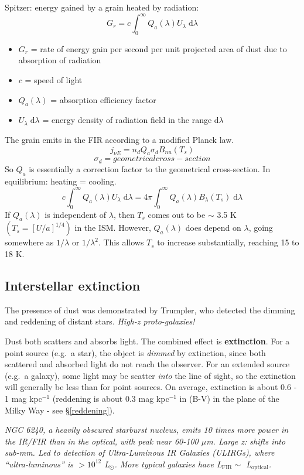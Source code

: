 \documentclass[11pt]{article}
\newcommand{\mar}[1]{\hspace{0pt}\marginpar{-\textcolor{black}{#1}-}}
\newcommand{\mynotes}[1]{{\fontfamily{cmss}\selectfont \textit{#1}}}
\begin{document}
Spitzer: energy gained by a grain heated by radiation:
\[
    G_{r} = c \int_{0}^{\infty}{
        Q_{a} (\lambda) U_{\lambda}\; \mathrm{d}\lambda}
    \]
\begin{itemize}
    \item $G_{r}$ = rate of energy gain per second per unit projected
        area of dust due to absorption of radiation
    \item $c$ = speed of light
    \item $Q_{a}(\lambda)$ = absorption efficiency factor
    \item $U_{\lambda}\; \mathrm{d}\lambda$ = energy density of radiation
        field in the range d$\lambda$
\end{itemize}
The grain emits in the FIR according to a modified Planck law.
\[
    j_{{\nu}E} = n_{d} Q_{a} \sigma_{d} B_{nu} (T_{s})
    \]
\[
    \sigma_{d} = geometrical cross-section
    \]
So $Q_{a}$ is essentially a correction factor to the geometrical cross-section.
In equilibrium: heating = cooling.\mar{111}
\[
    c \int_{0}^{\infty}{
        Q_{a} (\lambda) U_{\lambda}\; \mathrm{d}\lambda }
    = 4\pi \int_{0}^{\infty}{
        Q_{a} (\lambda) B_{\lambda} (T_{s})\; \mathrm{d}\lambda }
    \]
If $Q_{a}(\lambda)$ is independent of $\lambda$, then $T_{s}$ comes out
to be $\sim$ 3.5 K $ (T_{s} = [U/a]^{1/4} ) $ in the ISM.
However, $Q_{a}(\lambda)$ does depend on $\lambda$, going somewhere
as $1/\lambda$ or $1/\lambda^{2}$. This allows $T_{s}$ to increase
substantially, reaching 15 to 18 K.

\subsection{Interstellar extinction}
\mar{116}The presence of dust was demonstrated by Trumpler, who detected the
dimming and reddening of distant stars. \mynotes{High-z proto-galaxies!}

Dust both scatters and absorbs light. The combined effect is
\textbf{extinction}. For a point source (e.g.\ a star), the object is
\emph{dimmed} by extinction, since both scattered and absorbed light do not
reach the observer. For an extended source (e.g.\ a galaxy), some light may be
scatter \emph{into} the line of sight, so the extinction will generally be less
than for point sources. On average, extinction is about 0.6 - 1 mag kpc$^{-1}$
(reddening is about 0.3 mag kpc$^{-1}$ in (B-V) in the plane of the Milky Way -
see \S{}\ref{reddening}).

\mynotes{NGC 6240, a heavily obscured starburst nucleus, emits 10 times more
power in the IR/FIR than in the optical, with peak near 60-100 $\mu$m.
Large z: shifts into sub-mm. Led to detection of Ultra-Luminous
IR Galaxies (ULIRGs), where ``ultra-luminous'' is $> 10^{12}$ L$_{\odot}$.
More typical galaxies have L$_{\mathrm{FIR}} \sim$ L$_{\mathrm{optical}}$.}
\end{document}
